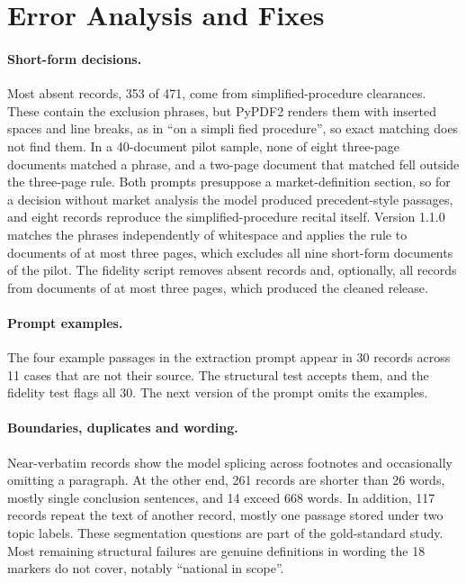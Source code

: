 \documentclass{IOS-Book-Article}
\begin{document}
\section{Error Analysis and Fixes}
\label{sec:errors}

\paragraph{Short-form decisions.} Most absent records, 353 of 471, come from
simplified-procedure clearances. These contain the exclusion phrases, but PyPDF2
renders them with inserted spaces and line breaks, as in ``on a simpli fied
procedure'', so exact matching does not find them. In a 40-document pilot
sample, none of eight three-page documents matched a phrase, and a two-page
document that matched fell outside the three-page rule. Both prompts presuppose
a market-definition section, so for a decision without market analysis the
model produced precedent-style passages, and eight records reproduce the
simplified-procedure recital itself. Version 1.1.0 matches the phrases
independently of whitespace and applies the rule to documents of at most three
pages, which excludes all nine short-form documents of the pilot. The fidelity
script removes absent records and, optionally, all records from documents of at
most three pages, which produced the cleaned release.

\paragraph{Prompt examples.} The four example passages in the extraction prompt
appear in 30 records across 11 cases that are not their source. The structural
test accepts them, and the fidelity test flags all 30. The next version of the
prompt omits the examples.

\paragraph{Boundaries, duplicates and wording.} Near-verbatim records show the
model splicing across footnotes and occasionally omitting a paragraph. At the
other end, 261 records are shorter than 26 words, mostly single conclusion
sentences, and 14 exceed 668 words. In addition, 117 records repeat the text of
another record, mostly one passage stored under two topic labels. These
segmentation questions are part of the gold-standard study. Most remaining
structural failures are genuine definitions in wording the 18 markers do not
cover, notably ``national in scope''.
\end{document}
